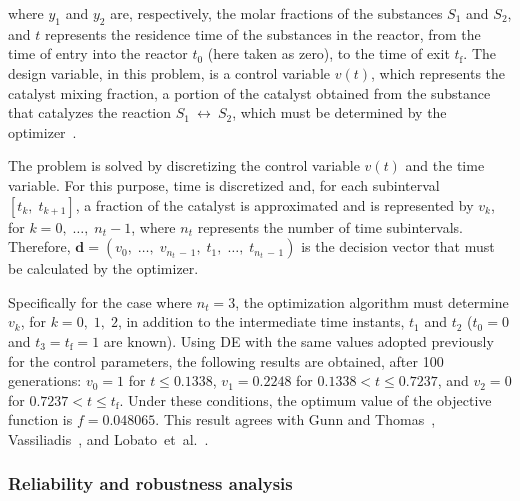\documentclass[final,5p,times,twocolumn,numbers]{elsarticle}
\begin{document}
\noindent where $ y_{1} $ and $ y_{2} $ are, respectively, the molar fractions of the substances $ S_{1} $ and $ S_{2} $, and $ t $ represents the residence time of the substances in the reactor, from the time of entry into the reactor $ t_{0} $ (here taken as zero), to the time of exit $ t_{\mathrm{f}} $. The design variable, in this problem, is a control variable $ v \left( t \right) $, which represents the catalyst mixing fraction, a portion of the catalyst obtained from the substance that catalyzes the reaction $ S_{1}~\longleftrightarrow~S_{2} $, which must be determined by the optimizer~\cite{bib:vassiliadis1993,bib:dadebo1995,bib:tanartkit1997,bib:bell2000,bib:irizarry2005,bib:liu2013,bib:liu2015,bib:lobato2019}.

The problem is solved by discretizing the control variable $ v \left( t \right) $ and the time variable. For this purpose, time is discretized and, for each subinterval $ \left[ t_{k}, \; t_{k + 1} \right] $, a fraction of the catalyst is approximated and is represented by $ v_{k} $, for $ k = 0, \; \dots, \; n_{t} - 1 $, where $ n_{t} $ represents the number of time subintervals. Therefore, $ \mathbf{d} = \left( v_{0}, \; \dots, \; v_{n_{t} \, - \, 1}, \; t_{1}, \; \dots, \; t_{n_{t} \, - \, 1} \right) $ is the decision vector that must be calculated by the optimizer.

Specifically for the case where $ n_{t} = 3 $, the optimization algorithm must determine $ v_{k} $, for $ k = 0, \; 1, \; 2 $, in addition to the intermediate time instants, $ t_{1} $ and $ t_{2} $ ($ t_{0} = 0 $ and $ t_{3} = t_{\mathrm{f}} = 1 $ are known). Using DE with the same values adopted previously for the control parameters, the following results are obtained, after 100 generations: $ v_{0} = 1 $ for $ t \leq 0.1338 $, $ v_{1} = 0.2248 $ for $ 0.1338 < t \leq 0.7237 $, and $ v_{2} = 0 $ for $ 0.7237 < t \leq t_{\mathrm{f}} $. Under these conditions, the optimum value of the objective function is $ f = 0.048065 $. This result agrees with Gunn and Thomas~\cite{bib:gunn1965}, Vassiliadis~\cite{bib:vassiliadis1993}, and Lobato~et~al.~\cite{bib:lobato2011b}.

\subsubsection{Reliability and robustness analysis}
\end{document}
